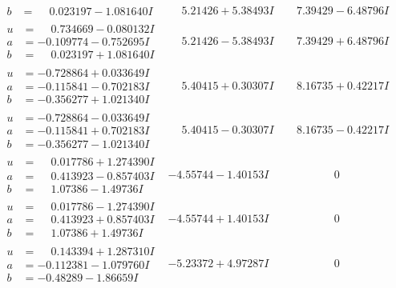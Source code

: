\documentclass[1p]{elsarticle_modified}
\theoremstyle{definition}
\begin{document}
$$\begin{array}{c|c|c}
\begin{aligned}
b &= \phantom{-}0.023197 - 1.081640 I\end{aligned}
 & \phantom{-}5.21426 + 5.38493 I & \phantom{-}7.39429 - 6.48796 I \\ \hline\begin{aligned}
u &= \phantom{-}0.734669 - 0.080132 I \\
a &= -0.109774 - 0.752695 I \\
b &= \phantom{-}0.023197 + 1.081640 I\end{aligned}
 & \phantom{-}5.21426 - 5.38493 I & \phantom{-}7.39429 + 6.48796 I \\ \hline\begin{aligned}
u &= -0.728864 + 0.033649 I \\
a &= -0.115841 - 0.702183 I \\
b &= -0.356277 + 1.021340 I\end{aligned}
 & \phantom{-}5.40415 + 0.30307 I & \phantom{-}8.16735 + 0.42217 I \\ \hline\begin{aligned}
u &= -0.728864 - 0.033649 I \\
a &= -0.115841 + 0.702183 I \\
b &= -0.356277 - 1.021340 I\end{aligned}
 & \phantom{-}5.40415 - 0.30307 I & \phantom{-}8.16735 - 0.42217 I \\ \hline\begin{aligned}
u &= \phantom{-}0.017786 + 1.274390 I \\
a &= \phantom{-}0.413923 - 0.857403 I \\
b &= \phantom{-}1.07386 - 1.49736 I\end{aligned}
 & -4.55744 - 1.40153 I & \phantom{-0.000000 } 0 \\ \hline\begin{aligned}
u &= \phantom{-}0.017786 - 1.274390 I \\
a &= \phantom{-}0.413923 + 0.857403 I \\
b &= \phantom{-}1.07386 + 1.49736 I\end{aligned}
 & -4.55744 + 1.40153 I & \phantom{-0.000000 } 0 \\ \hline\begin{aligned}
u &= \phantom{-}0.143394 + 1.287310 I \\
a &= -0.112381 - 1.079760 I \\
b &= -0.48289 - 1.86659 I\end{aligned}
 & -5.23372 + 4.97287 I & \phantom{-0.000000 } 0 \\ \hline\begin{aligned}

\end{aligned}
\end{array}$$
\end{document}
